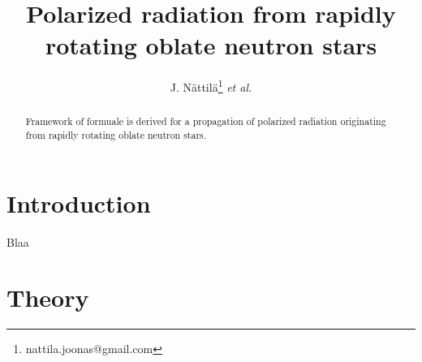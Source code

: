 \documentclass[iop, usenatbib]{emulateapj}
\begin{document}
\title{Polarized radiation from rapidly rotating oblate neutron stars}

\author{J. N\"attil\"a\thanks{nattila.joonas@gmail.com} \textit{et al.} }

\affil{}


\begin{abstract}
Framework of formuale is derived for a propagation of polarized radiation originating from rapidly rotating oblate neutron stars.
\end{abstract}

\section{Introduction}
Blaa





\section{Theory}\label{sect:theory}
\end{document}
